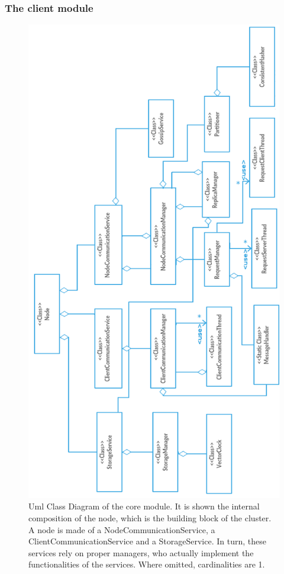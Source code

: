 \documentclass{article}
\begin{document}
\subsubsection{The client module} 

\begin{figure}[t]
\centering
\includegraphics[scale=0.43]{core_diagram}
\caption{Uml Class Diagram of the core module. It is shown the internal composition of the node, which is the building block of the cluster. A node is made of a NodeCommunicationService, a ClientCommunicationService and a StorageService. In turn, these services rely on proper managers, who actually implement the functionalities of the services. Where omitted, cardinalities are 1.}
\label{fig:class_diag}
\end{figure}
\end{document}
